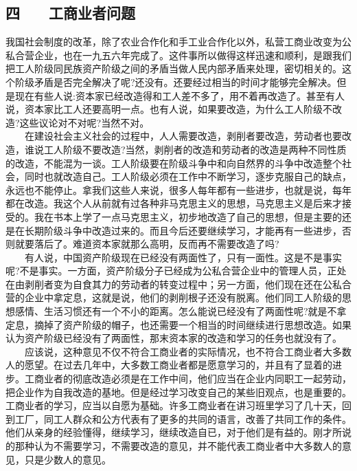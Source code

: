 \documentclass[cn,11pt,chinese]{elegantbook}
\def\myformat#1{\hfil\hfil #1}
\begin{document}
\subsection*{\myformat{四　　工商业者问题}}
我国社会制度的改革，除了农业合作化和手工业合作化以外，私营工商业改变为公私合营企业，也在一九五六年完成了。这件事所以做得这样迅速和顺利，是跟我们把工人阶级同民族资产阶级之间的矛盾当做人民内部矛盾来处理，密切相关的。这个阶级矛盾是否完全解决了呢?还没有。还要经过相当的时间才能够完全解决。但是现在有些人说:资本家已经改造得和工人差不多了，用不着再改造了。甚至有人说，资本家比工人还要高明一点。也有人说，如果要改造，为什么工人阶级不改造?这些议论对不对呢?当然不对。\\
　　在建设社会主义社会的过程中，人人需要改造，剥削者要改造，劳动者也要改造，谁说工人阶级不要改造?当然，剥削者的改造和劳动者的改造是两种不同性质的改造，不能混为一谈。工人阶级要在阶级斗争中和向自然界的斗争中改造整个社会，同时也就改造自己。工人阶级必须在工作中不断学习，逐步克服自己的缺点，永远也不能停止。拿我们这些人来说，很多人每年都有一些进步，也就是说，每年都在改造。我这个人从前就有过各种非马克思主义的思想，马克思主义是后来才接受的。我在书本上学了一点马克思主义，初步地改造了自己的思想，但是主要的还是在长期阶级斗争中改造过来的。而且今后还要继续学习，才能再有一些进步，否则就要落后了。难道资本家就那么高明，反而再不需要改造了吗?\\
　　有人说，中国资产阶级现在已经没有两面性了，只有一面性。这是不是事实呢?不是事实。一方面，资产阶级分子已经成为公私合营企业中的管理人员，正处在由剥削者变为自食其力的劳动者的转变过程中；另一方面，他们现在还在公私合营的企业中拿定息，这就是说，他们的剥削根子还没有脱离。他们同工人阶级的思想感情、生活习惯还有一个不小的距离。怎么能说已经没有了两面性呢?就是不拿定息，摘掉了资产阶级的帽子，也还需要一个相当的时间继续进行思想改造。如果认为资产阶级已经没有了两面性，那末资本家的改造和学习的任务也就没有了。\\
　　应该说，这种意见不仅不符合工商业者的实际情况，也不符合工商业者大多数人的愿望。在过去几年中，大多数工商业者都是愿意学习的，并且有了显着的进步。工商业者的彻底改造必须是在工作中间，他们应当在企业内同职工一起劳动，把企业作为自我改造的基地。但是经过学习改变自己的某些旧观点，也是重要的。工商业者的学习，应当以自愿为基础。许多工商业者在讲习班里学习了几十天，回到工厂，同工人群众和公方代表有了更多的共同的语言，改善了共同工作的条件。他们从亲身的经验懂得，继续学习，继续改造自已，对于他们是有益的。刚才所说的那种认为不需要学习，不需要改造的意见，并不能代表工商业者中大多数人的意见，只是少数人的意见。\\
\end{document}
